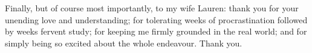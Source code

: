Finally, but of course most importantly, to my wife Lauren: thank you
for your unending love and understanding; for tolerating weeks of procrastination
followed by weeks fervent study; for keeping me firmly grounded in the real
world; and for simply being so excited about the whole 
endeavour.  Thank you.



\singlespace
\cleardoublepage
\tableofcontents
\listoftables
\listoffigures
\listofalgorithms

\cleardoublepage
\onehalfspace
{}











\singlespace

\appendix






